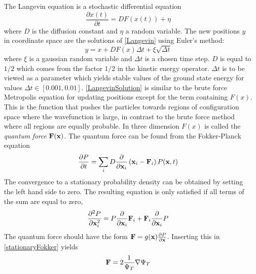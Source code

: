 \documentclass[english, a4paper]{article}
\begin{document}
\noindent The Langevin equation is a stochastic differential equation
\begin{equation}
 \frac{\partial x(t)}{\partial t} = D F(x(t)) + \eta
 \label{Langevin}
\end{equation}
where $D$ is the diffusion constant and $\eta$ a random variable.
The new positions $y$ in coordinate space are the solutions of \eqref{Langevin} using Euler's method:
\begin{equation}
 y = x + DF(x)\Delta t + \xi \sqrt{\Delta t}
 \label{LangevinSolution}
\end{equation}
where $\xi$ is a gaussian random variable and $\Delta t$ is a chosen time step. $D$ is equal to $1/2$
which comes from the factor $1/2$ in the kinetic energy operator. $\Delta t$ is to be viewed as a
parameter which yields stable values of the ground state energy for values $\Delta t \in [0.001, 0.01]$.
\eqref{LangevinSolution} is similar to the brute force Metropolis equation for updating positions except for the
term  containing $F(x)$. This is the function that pushes the particles towards regions of configuration space
where the wavefunction is large, in contrast to the brute force method where all regions are equally probable. 
In three dimension $F(x)$ is called the \textit{quantum force} ${\bf F}({\bf x})$.
The quantum force can be found from the
Fokker-Planck equation
\begin{equation}
 \frac{\partial P}{\partial t} = \sum_i D \frac{\partial}{\partial {\bf x}_i}
 \left( {\bf x}_i - {\bf F}_i \right) P({\bf x}, t)
 \label{FokkerPlanck}
\end{equation}
The convergence to a stationary probability density can be obtained by setting the left hand side to zero. 
The resulting equation is only satisfied if all terms of the sum are equal to zero, 
\begin{equation}
 \frac{\partial^2 P}{\partial {\bf x}_i^2} = P \frac{\partial}{\partial {\bf x}_i} {\bf F}_i
 + {\bf F}_i \frac{\partial}{\partial {\bf x}_i} P
 \label{stationaryFokker}
\end{equation}
The quantum force should have the form ${\bf F} = g({\bf x}) \frac{\partial P}{\partial {\bf x}}$. Inserting this in
\eqref{stationaryFokker} yields 
\begin{equation}
 {\bf F} = 2 \frac{1}{\Psi_T} \nabla \Psi_T
 \label{quantumForce}
\end{equation}
\end{document}
